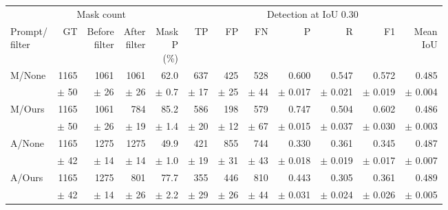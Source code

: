 \begin{table}[htbp]
\centering
\small
\setlength{\tabcolsep}{1.5pt}
\renewcommand{\arraystretch}{0.9}
\begin{tabular}{l|rrr|r|rrrrrrr}
\hline
 & \multicolumn{3}{c|}{Mask count} &  & \multicolumn{7}{c}{Detection at IoU 0.30} \\
  \shortstack{Prompt/\\filter}  & GT & \shortstack{Before\\filter} & \shortstack{After\\filter} & \shortstack{Mask\\P\\(\%)}  & TP & FP & FN & P & R & F1 & \shortstack{Mean\\IoU} \\
\hline
M/None & 1165 & 1061 & 1061 & 62.0 & 637 & 425 & 528 & 0.600 & 0.547 & 0.572 & 0.485 \\
 & $\pm$ 50 & $\pm$ 26 & $\pm$ 26 & $\pm$ 0.7 & $\pm$ 17 & $\pm$ 25 & $\pm$ 44 & $\pm$ 0.017 & $\pm$ 0.021 & $\pm$ 0.019 & $\pm$ 0.004 \\
M/Ours & 1165 & 1061 & 784 & 85.2 & 586 & 198 & 579 & 0.747 & 0.504 & 0.602 & 0.486 \\
 & $\pm$ 50 & $\pm$ 26 & $\pm$ 19 & $\pm$ 1.4 & $\pm$ 20 & $\pm$ 12 & $\pm$ 67 & $\pm$ 0.015 & $\pm$ 0.037 & $\pm$ 0.030 & $\pm$ 0.003 \\
\hline
A/None & 1165 & 1275 & 1275 & 49.9 & 421 & 855 & 744 & 0.330 & 0.361 & 0.345 & 0.487 \\
 & $\pm$ 42 & $\pm$ 14 & $\pm$ 14 & $\pm$ 1.0 & $\pm$ 19 & $\pm$ 31 & $\pm$ 43 & $\pm$ 0.018 & $\pm$ 0.019 & $\pm$ 0.017 & $\pm$ 0.007 \\
A/Ours & 1165 & 1275 & 801 & 77.7 & 355 & 446 & 810 & 0.443 & 0.305 & 0.361 & 0.489 \\
 & $\pm$ 42 & $\pm$ 14 & $\pm$ 26 & $\pm$ 2.2 & $\pm$ 29 & $\pm$ 26 & $\pm$ 44 & $\pm$ 0.031 & $\pm$ 0.024 & $\pm$ 0.026 & $\pm$ 0.005 \\
\hline
\end{tabular}%
\end{table}
